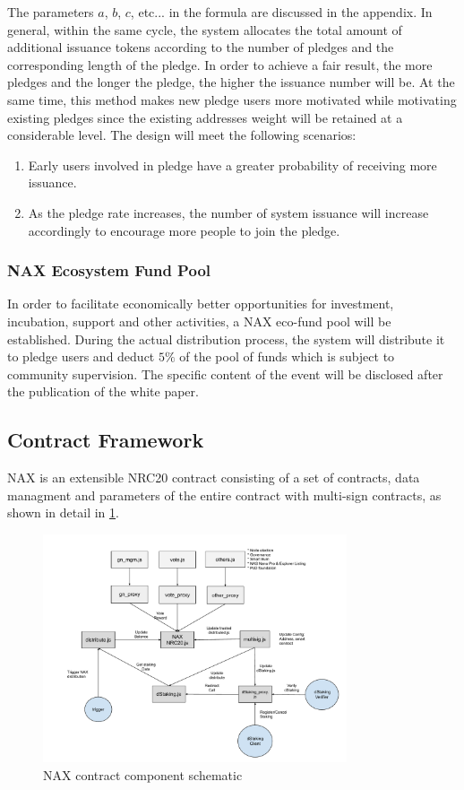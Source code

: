 The parameters $a$, $b$, $c$, etc... in the formula are discussed in the appendix. In general, within the same cycle, the system allocates the total amount of additional issuance tokens according to the number of pledges and the corresponding length of the pledge. In order to achieve a fair result, the more pledges and the longer the pledge, the higher the issuance number will be. At the same time, this method makes new pledge users more motivated while motivating existing pledges since the existing addresses weight will be retained at a considerable level. The design will meet the following scenarios:

\begin{enumerate}[\hspace{1cm}(a)]
  \item Early users involved in pledge have a greater probability of receiving more issuance.
  \item As the pledge rate increases, the number of system issuance will increase accordingly to encourage more people to join the pledge.
\end{enumerate}

\subsubsection{NAX Ecosystem Fund Pool}
In order to facilitate economically better opportunities for investment, incubation, support and other activities, a NAX eco-fund pool will be established. During the actual distribution process, the system will distribute it to pledge users and deduct $5\%$ of the pool of funds which is subject to community supervision. The specific content of the event will be disclosed after the publication of the white paper.

\subsection{Contract Framework}
NAX is an extensible NRC20 contract consisting of a set of contracts, data managment and parameters of the entire contract with multi-sign contracts, as shown in detail in \ref{fig:nax_framework}.

\begin{figure}[htbp]
  \centering
  \includegraphics[width=0.8\textwidth]{../common/nax.pdf}
  \caption{NAX contract component schematic \label{fig:nax_framework}}
\end{figure}
